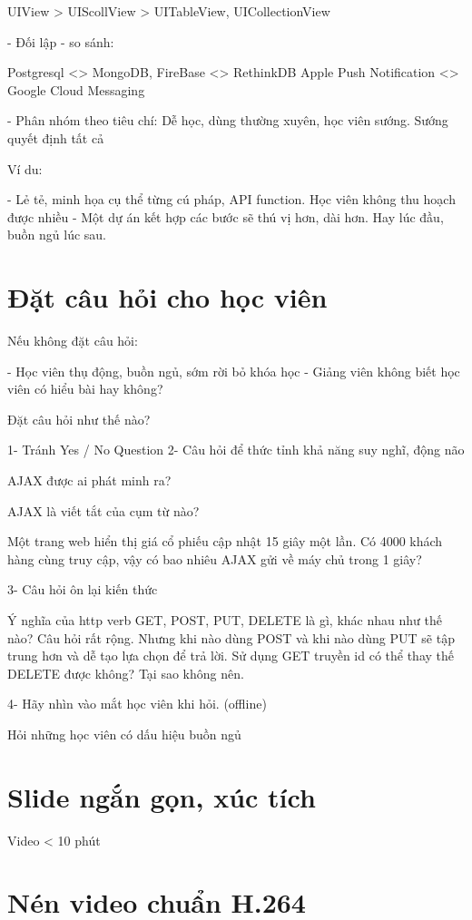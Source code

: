  UIView > UIScollView > UITableView, UICollectionView

- Đối lập - so sánh:

 Postgresql <> MongoDB, FireBase <> RethinkDB
 Apple Push Notification <> Google Cloud Messaging

- Phân nhóm theo tiêu chí: Dễ học, dùng thường xuyên, học viên sướng. Sướng quyết định tất cả

Ví du:

- Lẻ tẻ, minh họa cụ thể từng cú pháp, API function. Học viên không thu hoạch được nhiều
- Một dự án kết hợp các bước sẽ thú vị hơn, dài hơn. Hay lúc đầu, buồn ngủ lúc sau.

\section{Đặt câu hỏi cho học viên}


Nếu không đặt câu hỏi:

- Học viên thụ động, buồn ngủ, sớm rời bỏ khóa học
- Giảng viên không biết học viên có hiểu bài hay không?

Đặt câu hỏi như thế nào?

1- Tránh Yes / No Question
2- Câu hỏi để thức tỉnh khả năng suy nghĩ, động não

AJAX được ai phát minh ra?

AJAX là viết tắt của cụm từ nào?

Một trang web hiển thị giá cổ phiếu cập nhật 15 giây một lần. Có 4000 khách hàng cùng truy cập, vậy có bao nhiêu AJAX gửi về máy chủ trong 1 giây?

3- Câu hỏi ôn lại kiến thức

Ý nghĩa của http verb GET, POST, PUT, DELETE là gì, khác nhau như thế nào? Câu hỏi rất rộng.
Nhưng khi nào dùng POST và khi nào dùng PUT sẽ tập trung hơn và dễ tạo lựa chọn để trả lời.
Sử dụng GET truyền id có thể thay thế DELETE được không? Tại sao không nên.

4- Hãy nhìn vào mắt học viên khi hỏi. (offline)

Hỏi những học viên có dấu hiệu buồn ngủ

\section{Slide ngắn gọn, xúc tích}

Video < 10 phút

\section{Nén video chuẩn H.264}

